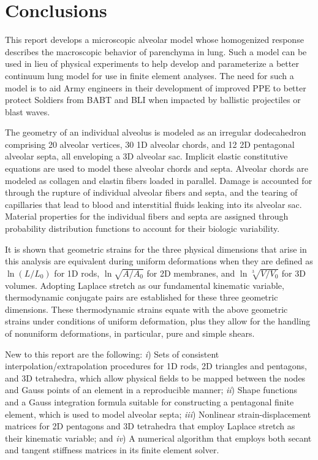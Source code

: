 \section{Conclusions}
\label{partConclusions}

This report develops a micro\-scopic alveolar model whose homogenized response describes the macro\-scopic behavior of parenchyma in lung.  Such a model can be used in lieu of physical experiments to help develop and parameterize a better continuum lung model for use in finite element analyses.   The need for such a model is to aid Army engineers in their development of improved PPE to better protect Soldiers from BABT and BLI when impacted by ballistic projectiles or blast waves.  

The geometry of an individual alveolus is modeled as an irregular dodecahedron comprising 20 alveolar vertices, 30 1D alveolar chords, and 12 2D pentagonal alveolar septa, all enveloping a 3D alveolar sac.  Implicit elastic constitutive equations are used to model these alveolar chords and septa.  Alveolar chords are modeled as collagen and elastin fibers loaded in parallel.  Damage is accounted for through the rupture of individual alveolar fibers and septa, and the tearing of capillaries that lead to blood and interstitial fluids leaking into its alveolar sac.  Material properties for the individual fibers and septa are assigned through probability distribution functions to account for their biologic variability.

It is shown that geometric strains for the three physical dimensions that arise in this analysis are equivalent during uniform deformations when they are defined as $\ln (L / L_0)$ for 1D rods, $\ln \sqrt{A / \! A_0}$ for 2D membranes, and $\ln \sqrt[3]{V \! / V_0}$ for 3D volumes.  Adopting Laplace stretch as our fundamental kinematic variable, thermo\-dynamic conjugate pairs are established for these three geometric dimensions.  These thermo\-dynamic strains equate with the above geometric strains under conditions of uniform deformation, plus they allow for the handling of nonuniform deformations, in particular, pure and simple shears.

New to this report are the following: \textit{i\/}) Sets of consistent interpolation\slash extrapolation procedures for 1D rods, 2D triangles and pentagons, and 3D tetrahedra, which allow physical fields to be mapped between the nodes and Gauss points of an element in a reproducible manner; \textit{ii\/}) Shape functions and a Gauss integration formula suitable for constructing a pentagonal finite element, which is used to model alveolar septa; \textit{iii\/}) Nonlinear strain-displacement matrices for 2D pentagons and 3D tetrahedra that employ Laplace stretch as their kinematic variable; and \textit{iv\/})  A numerical algorithm that employs both secant and tangent stiffness matrices in its finite element solver.

